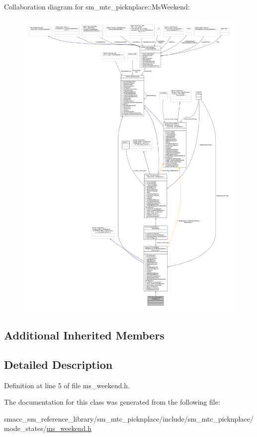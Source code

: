 Collaboration diagram for sm\+\_\+mtc\+\_\+picknplace\+:\+:Ms\+Weekend\+:
\nopagebreak
\begin{figure}[H]
\begin{center}
\leavevmode
\includegraphics[width=350pt]{classsm__mtc__picknplace_1_1MsWeekend__coll__graph}
\end{center}
\end{figure}
\subsection*{Additional Inherited Members}


\subsection{Detailed Description}


Definition at line 5 of file ms\+\_\+weekend.\+h.



The documentation for this class was generated from the following file\+:\begin{DoxyCompactItemize}
\item 
smacc\+\_\+sm\+\_\+reference\+\_\+library/sm\+\_\+mtc\+\_\+picknplace/include/sm\+\_\+mtc\+\_\+picknplace/mode\+\_\+states/\hyperlink{sm__mtc__picknplace_2include_2sm__mtc__picknplace_2mode__states_2ms__weekend_8h}{ms\+\_\+weekend.\+h}\end{DoxyCompactItemize}
